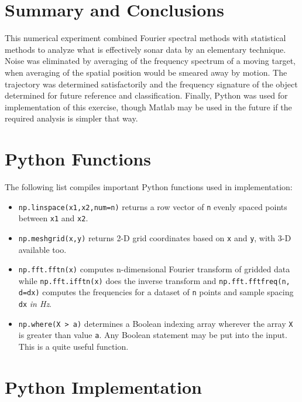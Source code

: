\documentclass{article}
\begin{document}
\section{Summary and Conclusions}
This numerical experiment combined Fourier spectral methods with statistical methods to analyze what is effectively sonar data by an elementary technique. Noise was eliminated by averaging of the frequency spectrum of a moving target, when averaging of the spatial position would be smeared away by motion. The trajectory was determined satisfactorily and the frequency signature of the object determined for future reference and classification. Finally, Python was used for implementation of this exercise, though Matlab may be used in the future if the required analysis is simpler that way.




\begin{appendices}

\section{Python Functions}\label{functions}
The following list compiles important Python functions used in implementation:
\begin{itemize}
    \item \texttt{np.linspace(x1,x2,num=n)} returns a row vector of \texttt{n} evenly spaced points between \texttt{x1} and \texttt{x2}. 
    \item \texttt{np.meshgrid(x,y)} returns 2-D grid coordinates based on \texttt{x} and \texttt{y}, with 3-D available too.
    \item \texttt{np.fft.fftn(x)} computes n-dimensional Fourier transform of gridded data while \texttt{np.fft.ifftn(x)} does the inverse transform and \texttt{np.fft.fftfreq(n, d=dx)} computes the frequencies for a dataset of \texttt{n} points and sample spacing \texttt{dx} \textit{in Hz}.
    \item \texttt{np.where(X > a)} determines a Boolean indexing array wherever the array \texttt{X} is greater than value \texttt{a}. Any Boolean statement may be put into the input. This is a quite useful function.
\end{itemize}

\section{Python Implementation}\label{implementation}




\end{appendices}
\end{document}
